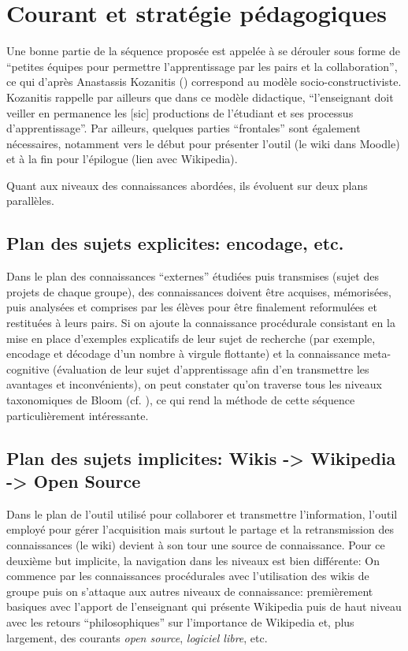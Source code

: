 \documentclass[11pt,bibliography=totoc]{scrartcl}
\begin{document}
\section{Courant et stratégie pédagogiques}
Une bonne partie de la séquence proposée est appelée à se dérouler sous forme de
``petites équipes pour permettre l'apprentissage par les pairs et la
collaboration'', ce qui d'après Anastassis Kozanitis (\cite{kozanitis})
correspond au modèle socio-constructiviste. Kozanitis rappelle par ailleurs que
dans ce modèle didactique, ``l'enseignant doit veiller en permanence les [sic]
productions de l'étudiant et ses processus d'apprentissage''.  Par ailleurs,
quelques parties ``frontales'' sont également nécessaires, notamment vers le
début pour présenter l'outil (le wiki dans Moodle) et à la fin pour l'épilogue
(lien avec Wikipedia).

Quant aux niveaux des connaissances abordées, ils évoluent sur deux plans
parallèles.

\subsection{Plan des sujets explicites: encodage, etc.}
Dans le plan des connaissances ``externes'' étudiées puis transmises (sujet des
projets de chaque groupe), des connaissances doivent être acquises, mémorisées,
puis analysées et comprises par les élèves pour être finalement reformulées et
restituées à leurs pairs. Si on ajoute la connaissance procédurale consistant en
la mise en place d'exemples explicatifs de leur sujet de recherche (par exemple,
encodage et décodage d'un nombre à virgule flottante) et la connaissance
meta-cognitive (évaluation de leur sujet d'apprentissage afin d'en transmettre
les avantages et inconvénients), on peut constater qu'on traverse tous les
niveaux taxonomiques de Bloom (cf. \cite{bloom}), ce qui rend la méthode de cette séquence
particulièrement intéressante.

\subsection{Plan des sujets implicites: Wikis -> Wikipedia -> Open Source}
Dans le plan de l'outil utilisé pour collaborer et transmettre l'information,
l'outil employé pour gérer l'acquisition mais surtout le partage et la
retransmission des connaissances (le wiki) devient à son tour une source de
connaissance.  Pour ce deuxième but implicite, la navigation dans les niveaux est
bien différente: On commence par les connaissances procédurales avec
l'utilisation des wikis de groupe puis on s'attaque aux autres niveaux de
connaissance: premièrement basiques avec l'apport de l'enseignant qui présente
Wikipedia puis de haut niveau avec les retours ``philosophiques'' sur
l'importance de Wikipedia et, plus largement, des courants \textit{open source},
\textit{logiciel libre}, etc.
\end{document}
